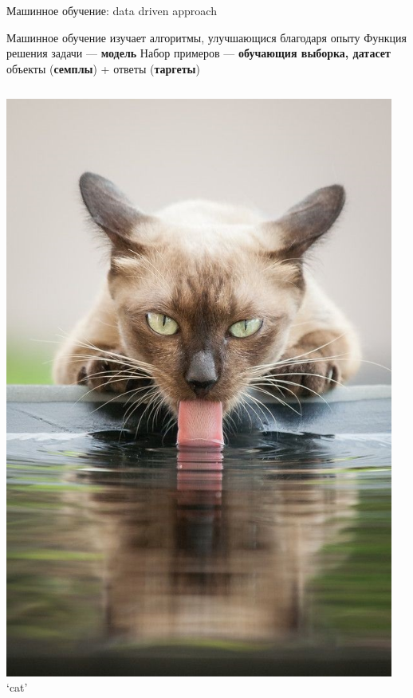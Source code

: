 \documentclass[aspectratio=169, professionalfonts]{beamer}
\begin{document}
\begin{frame}{Машинное обучение: data driven approach}
    \begin{outline}
        \1 Машинное обучение изучает алгоритмы, улучшающися благодаря опыту
        \1 Функция решения задачи --- \textbf{модель}
        \1 Набор примеров --- \textbf{обучающия выборка, датасет}
            \2 объекты (\textbf{семплы}) + ответы (\textbf{таргеты})
    \end{outline}
    \begin{columns}
        \begin{column}{.1\linewidth}
            \centering
            \includegraphics[width=\linewidth]{figures/fig29-dataset-sample.jpg}
            `cat'
        \end{column}
        \begin{column}{.1\linewidth}

\end{column}
\end{columns}
\end{frame}
\end{document}
